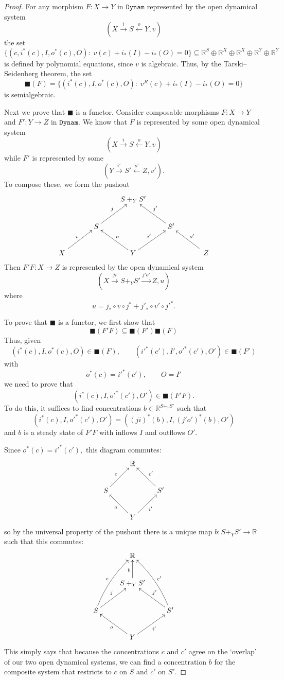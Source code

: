 \documentclass{compositionalityarticle}
\newcommand{\R}{\mathbb{R}}
\newcommand{\Dynam}{\mathtt{Dynam}}
\newcommand{\maps}{\colon}
\theoremstyle{compositionality}
\theoremstyle{remark}
\begin{document}
\begin{proof}
For any morphism $F \maps X \to Y$ in $\Dynam$ represented by the open dynamical system 
\[         (X \stackrel{i}\longrightarrow S \stackrel{o}\longleftarrow Y, v) \]
the set 
\[       \{(c, i^*(c),I,o^*(c),O) : \; v(c) + i_*(I) - i_*(O) = 0 \} \subseteq
\R^S \oplus \R^X \oplus \R^X \oplus \R^Y \oplus \R^Y \] 
is defined by polynomial equations, since $v$ is algebraic.   Thus, by the Tarski--Seidenberg theorem, the set 
\[    \blacksquare(F) = \{  (i^*(c),I,o^*(c),O) : \; v^R(c) + i_*(I) - i_*(O) = 0 \} \]
is semialgebraic.   

Next we prove that $\blacksquare$ is a functor.  Consider composable morphisms $F \maps X \to Y$ and $F' \maps Y \to Z$ in $\Dynam$.   We know that $F$ is represented by some open dynamical system 
\[         (X \stackrel{i}\longrightarrow S \stackrel{o}\longleftarrow Y, v) \]
while $F'$ is represented by some
\[         (Y \stackrel{i'}\longrightarrow S' \stackrel{o'}\longleftarrow Z, v') .\]
To compose these, we form the pushout
\[
    \xymatrix{
      && S +_Y S' \\
      & S \ar[ur]^{j} && S' \ar[ul]_{j'} \\
      \quad X\quad \ar[ur]^{i} && Y \ar[ul]_{o} \ar[ur]^{i'} &&\quad Z \quad \ar[ul]_{o'}
    }
\]
Then $F'F \maps X \to Z$ is represented by the open dynamical system
\[ (X \stackrel{j i}{\longrightarrow} S +_Y S' \stackrel{j' o'}{\longrightarrow} Z, u ) \]
where 
\[    u = j_* \circ v \circ j^* + {j'}_* \circ v' \circ {j'}^*  .\]

To prove that $\blacksquare$ is a functor, we first show that 
\[ \blacksquare(F'F) \subseteq \blacksquare(F') \blacksquare(F) \]  
Thus, given
\[     (i^*(c),I,o^*(c),O) \in \blacksquare(F), \qquad  ({i'}^*(c'),I',{o'}^*(c'),O') \in \blacksquare(F') \]
with 
\[   o^*(c) = {i'}^*(c'), \qquad O = I' \]
we need to prove that 
\[     (i^*(c),I,{o'}^*(c'),O') \in \blacksquare(F'F). \]
To do this, it suffices to find concentrations $b \in \R^{S +_Y S'}$ such that 
\[   (i^*(c),I,{o'}^*(c'),O') = ((ji)^*(b), I, {(j'o')}^*(b), O') \]
and $b$ is a steady state of $F'F$ with inflows $I$ and outflows $O'$.

Since  $o^*(c) = {i'}^*(c'),$ this diagram commutes:
\[
    \xymatrix{
      && \R \\
      & S \ar[ur]^{c} && S' \ar[ul]_{c'} \\
       && Y \ar[ul]^{o} \ar[ur]_{i'} &&
    }
\]
so by the universal property of the pushout there is a unique map $b \maps S +_Y S' \to \R$ such that
this commutes:
\begin{equation}
\label{eq:pushout}
    \xymatrix{
      && \R \\
     && S +_Y  S' \ar[u]^b \\      
      & S \ar@/^/[uur]^{c} \ar[ur]^{j} && S' \ar@/_/[uul]_{c'} \ar[ul]_{j'} \\
       && Y \ar[ul]^{o} \ar[ur]_{i'} &&
    }
\end{equation}
This simply says that because the concentrations $c$ and $c'$ agree on the `overlap' of our two
open dynamical systems, we can find a concentration $b$ for the composite system that restricts
to $c$ on $S$ and $c'$ on $S'$.


\end{proof}
\end{document}

